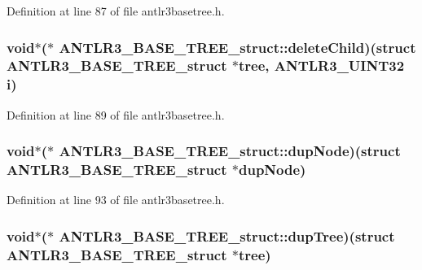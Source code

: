 Definition at line 87 of file antlr3basetree.\-h.

\hypertarget{struct_a_n_t_l_r3___b_a_s_e___t_r_e_e__struct_ab532435f4f9011eba57978598ce41f26}{
\subsubsection[{delete\-Child}]{\setlength{\rightskip}{0pt plus 5cm}void$\ast$($\ast$ A\-N\-T\-L\-R3\-\_\-\-B\-A\-S\-E\-\_\-\-T\-R\-E\-E\-\_\-struct\-::delete\-Child)(struct {\bf A\-N\-T\-L\-R3\-\_\-\-B\-A\-S\-E\-\_\-\-T\-R\-E\-E\-\_\-struct} $\ast$tree, {\bf A\-N\-T\-L\-R3\-\_\-\-U\-I\-N\-T32} {\bf i})}}\label{struct_a_n_t_l_r3___b_a_s_e___t_r_e_e__struct_ab532435f4f9011eba57978598ce41f26}


Definition at line 89 of file antlr3basetree.\-h.

\hypertarget{struct_a_n_t_l_r3___b_a_s_e___t_r_e_e__struct_adfea4c4a926504619d1d6fed82aedff4}{
\subsubsection[{dup\-Node}]{\setlength{\rightskip}{0pt plus 5cm}void$\ast$($\ast$ A\-N\-T\-L\-R3\-\_\-\-B\-A\-S\-E\-\_\-\-T\-R\-E\-E\-\_\-struct\-::dup\-Node)(struct {\bf A\-N\-T\-L\-R3\-\_\-\-B\-A\-S\-E\-\_\-\-T\-R\-E\-E\-\_\-struct} $\ast$dup\-Node)}}\label{struct_a_n_t_l_r3___b_a_s_e___t_r_e_e__struct_adfea4c4a926504619d1d6fed82aedff4}


Definition at line 93 of file antlr3basetree.\-h.

\hypertarget{struct_a_n_t_l_r3___b_a_s_e___t_r_e_e__struct_a471c30eaee3791629a442719c5f59bba}{
\subsubsection[{dup\-Tree}]{\setlength{\rightskip}{0pt plus 5cm}void$\ast$($\ast$ A\-N\-T\-L\-R3\-\_\-\-B\-A\-S\-E\-\_\-\-T\-R\-E\-E\-\_\-struct\-::dup\-Tree)(struct {\bf A\-N\-T\-L\-R3\-\_\-\-B\-A\-S\-E\-\_\-\-T\-R\-E\-E\-\_\-struct} $\ast$tree)}}\label{struct_a_n_t_l_r3___b_a_s_e___t_r_e_e__struct_a471c30eaee3791629a442719c5f59bba}


